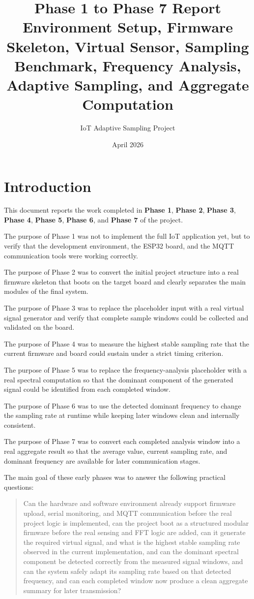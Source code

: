 \documentclass[12pt,a4paper]{article}
\title{Phase 1 to Phase 7 Report\\Environment Setup, Firmware Skeleton, Virtual Sensor, Sampling Benchmark, Frequency Analysis, Adaptive Sampling, and Aggregate Computation}
\author{IoT Adaptive Sampling Project}
\date{April 2026}
\begin{document}
\maketitle

\section{Introduction}

This document reports the work completed in \textbf{Phase 1},
\textbf{Phase 2}, \textbf{Phase 3}, \textbf{Phase 4}, \textbf{Phase 5},
\textbf{Phase 6}, and \textbf{Phase 7} of the project.

The purpose of Phase 1 was not to implement the full IoT application yet, but
to verify that the development environment, the ESP32 board, and the MQTT
communication tools were working correctly.

The purpose of Phase 2 was to convert the initial project structure into a real
firmware skeleton that boots on the target board and clearly separates the main
modules of the final system.

The purpose of Phase 3 was to replace the placeholder input with a real virtual
signal generator and verify that complete sample windows could be collected and
validated on the board.

The purpose of Phase 4 was to measure the highest stable sampling rate that the
current firmware and board could sustain under a strict timing criterion.

The purpose of Phase 5 was to replace the frequency-analysis placeholder with a
real spectral computation so that the dominant component of the generated
signal could be identified from each completed window.

The purpose of Phase 6 was to use the detected dominant frequency to change the
sampling rate at runtime while keeping later windows clean and internally
consistent.

The purpose of Phase 7 was to convert each completed analysis window into a
real aggregate result so that the average value, current sampling rate, and
dominant frequency are available for later communication stages.

The main goal of these early phases was to answer the following practical
questions:

\begin{quote}
Can the hardware and software environment already support firmware upload,
serial monitoring, and MQTT communication before the real project logic is
implemented, can the project boot as a structured modular firmware before
the real sensing and FFT logic are added, can it generate the required virtual
signal, and what is the highest stable sampling rate observed in the current
implementation, and can the dominant spectral component be detected correctly
from the measured signal windows, and can the system safely adapt its sampling
rate based on that detected frequency, and can each completed window now
produce a clean aggregate summary for later transmission?
\end{quote}
\end{document}

